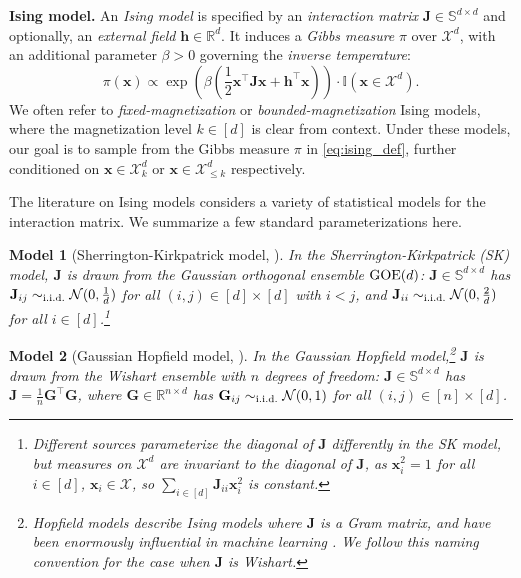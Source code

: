 \documentclass[11pt]{article}
\newtheorem{model}{Model}
\newcommand{\R}{\mathbb{R}}
\newcommand{\half}{\frac{1}{2}}
\newcommand{\1}{\mathbf{1}}
\newcommand{\0}{\mathbf{0}}
\newcommand{\ind}{\mathbb{I}}
\newcommand{\Nor}{\mathcal{N}}
\newcommand{\Par}[1]{\left(#1\right)}
\newcommand{\Sym}{\mathbb{S}}
\newcommand{\simiid}{\sim_{\textup{i.i.d.}}}
\newcommand{\mg}{{\mathbf{G}}}
\newcommand{\mj}{{\mathbf{J}}}
\newcommand{\vh}{{\mathbf{h}}}
\newcommand{\vx}{{\mathbf{x}}}
\newcommand{\calX}{{\mathcal{X}}}
\begin{document}
\textbf{Ising model.} An \emph{Ising model} is specified by an \emph{interaction matrix} $\mj \in \Sym^{d \times d}$ and optionally, an \emph{external field} $\vh \in \R^d$. It induces a \emph{Gibbs measure} $\pi$ over $\calX^d$, with an additional parameter $\beta > 0$ governing the \emph{inverse temperature}:
\begin{equation}\label{eq:ising_def}\pi(\vx) \propto \exp\Par{\beta\Par{\half \vx^\top \mj \vx + \vh^\top \vx}} \cdot \ind(\vx \in \calX^d).\end{equation}
We often refer to \emph{fixed-magnetization} or \emph{bounded-magnetization} Ising models, where the magnetization level $k \in [d]$ is clear from context. Under these models, our goal is to sample from the Gibbs measure $\pi$ in \eqref{eq:ising_def}, further conditioned on $\vx \in \calX^d_k$ or $\vx \in \calX^d_{\le k}$ respectively.

The literature on Ising models considers a variety of statistical models for the interaction matrix. We summarize a few standard parameterizations here.

\begin{model}[Sherrington-Kirkpatrick model, \cite{SherringtonK75}]\label{model:sk}
In the \emph{Sherrington-Kirkpatrick (SK) model}, $\mj$ is drawn from the \emph{Gaussian orthogonal ensemble} $\textup{GOE}(d)$: $\mj \in \Sym^{d \times d}$ has $\mj_{ij} \simiid \Nor(0, \frac 1 d)$ for all $(i, j) \in [d] \times [d]$ with $i < j$, and $\mj_{ii} \simiid \Nor(0, \frac 2 d)$ for all $i \in [d]$.\footnote{Different sources parameterize the diagonal of $\mj$ differently in the SK model, but measures on $\calX^d$ are invariant to the diagonal of $\mj$, as $\vx_i^2 = 1$ for all $i \in [d]$, $\vx_i \in \calX$, so $\sum_{i \in [d]} \mj_{ii}\vx_i^2$ is constant.}
\end{model}

\begin{model}[Gaussian Hopfield model, \cite{BovierEN99, BarraG08, HamzeRPBK20}]\label{model:hopfield}
In the \emph{Gaussian Hopfield model},\footnote{Hopfield models \cite{Hopfield82} describe Ising models where $\mj$ is a Gram matrix, and have been enormously influential in machine learning \cite{AmitGS85, AmitGS87}. We follow this naming convention for the case when $\mj$ is Wishart.} $\mj$ is drawn from the \emph{Wishart ensemble} with $n$ degrees of freedom: $\mj \in \Sym^{d \times d}$ has $\mj = \frac 1 n \mg^\top \mg$, where $\mg \in \R^{n \times d}$ has $\mg_{ij} \simiid \Nor(0, 1)$ for all $(i, j) \in [n] \times [d]$.
\end{model}
\end{document}
